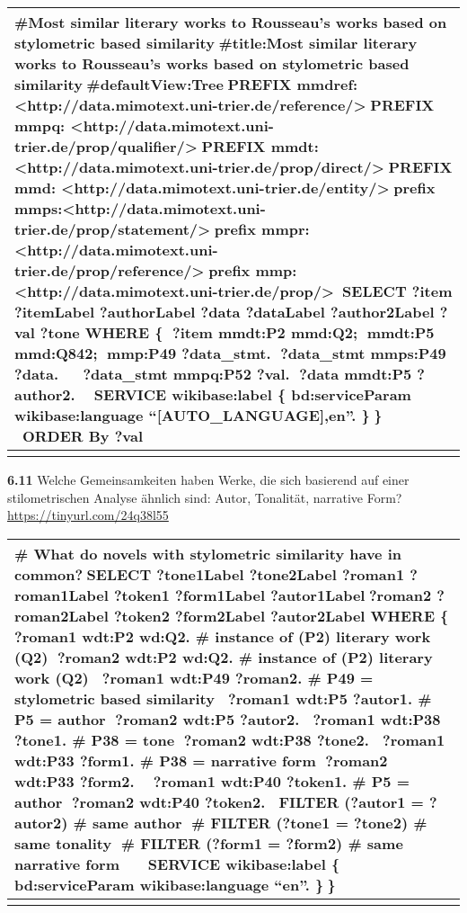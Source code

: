 \documentclass[
  letterpaper,
  DIV=11,
  numbers=noendperiod]{scrreprt}
\begin{document}
\begin{longtable}[]{@{}
  >{\raggedright\arraybackslash}p{}@{}}
\toprule\noalign{}
\begin{minipage}[b]{\linewidth}\raggedright
\#Most similar literary works to Rousseau's works based on stylometric
based similarity\#title:Most similar literary works to Rousseau's works
based on stylometric based similarity\#defaultView:TreePREFIX mmdref:
\textless http://data.mimotext.uni-trier.de/reference/\textgreater{}PREFIX
mmpq:
\textless http://data.mimotext.uni-trier.de/prop/qualifier/\textgreater{}PREFIX
mmdt:
\textless http://data.mimotext.uni-trier.de/prop/direct/\textgreater{}PREFIX
mmd:
\textless http://data.mimotext.uni-trier.de/entity/\textgreater{}prefix
mmps:\textless http://data.mimotext.uni-trier.de/prop/statement/\textgreater{}prefix
mmpr:
\textless http://data.mimotext.uni-trier.de/prop/reference/\textgreater{}prefix
mmp:
\textless http://data.mimotext.uni-trier.de/prop/\textgreater{}SELECT
?item ?itemLabel ?authorLabel ?data ?dataLabel ?author2Label ?val ?tone
WHERE \{ ?item mmdt:P2 mmd:Q2; mmdt:P5 mmd:Q842; mmp:P49 ?data\_stmt.
?data\_stmt mmps:P49 ?data.   ?data\_stmt mmpq:P52 ?val. ?data mmdt:P5
?author2.  SERVICE wikibase:label \{ bd:serviceParam wikibase:language
``{[}AUTO\_LANGUAGE{]},en''. \}\} ORDER By ?val
\end{minipage} \\
\midrule\noalign{}
\endhead
\bottomrule\noalign{}
\endlastfoot
\end{longtable}

\textbf{6.11} Welche Gemeinsamkeiten haben Werke, die sich basierend auf
einer stilometrischen Analyse ähnlich sind: Autor, Tonalität, narrative
Form? \url{https://tinyurl.com/24q38l55}

\begin{longtable}[]{@{}
  >{\raggedright\arraybackslash}p{}@{}}
\toprule\noalign{}
\begin{minipage}[b]{\linewidth}\raggedright
\# What do novels with stylometric similarity have in common?SELECT
?tone1Label ?tone2Label ?roman1 ?roman1Label ?token1 ?form1Label
?autor1Label?roman2 ?roman2Label ?token2 ?form2Label ?autor2Label WHERE
\{ ?roman1 wdt:P2 wd:Q2. \# instance of (P2) literary work (Q2) ?roman2
wdt:P2 wd:Q2. \# instance of (P2) literary work (Q2) ?roman1 wdt:P49
?roman2. \# P49 = stylometric based similarity ?roman1 wdt:P5 ?autor1.
\# P5 = author ?roman2 wdt:P5 ?autor2. ?roman1 wdt:P38 ?tone1. \# P38 =
tone ?roman2 wdt:P38 ?tone2. ?roman1 wdt:P33 ?form1. \# P38 = narrative
form ?roman2 wdt:P33 ?form2.  ?roman1 wdt:P40 ?token1. \# P5 = author
?roman2 wdt:P40 ?token2. FILTER (?autor1 = ?autor2) \# same author \#
FILTER (?tone1 = ?tone2) \# same tonality \# FILTER (?form1 = ?form2) \#
same narrative form   SERVICE wikibase:label \{ bd:serviceParam
wikibase:language ``en''. \}\}
\end{minipage} \\
\midrule\noalign{}
\endhead
\bottomrule\noalign{}
\endlastfoot
\end{longtable}
\end{document}
